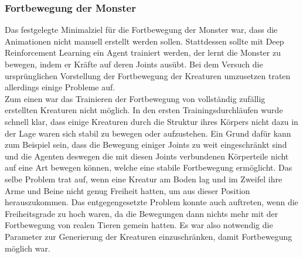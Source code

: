 \subsubsection{Fortbewegung der Monster}

Das festgelegte Minimalziel für die Fortbewegung der Monster war, dass die Animationen nicht manuell erstellt werden sollen. 
Stattdessen sollte mit Deep Reinforcement Learning ein Agent trainiert werden, der lernt die Monster zu bewegen, indem er Kräfte auf deren Joints ausübt.
Bei dem Versuch die ursprünglichen Vorstellung der Fortbewegung der Kreaturen umzusetzen traten allerdings einige Probleme auf.\\

Zum einen war das Trainieren der Fortbewegung von vollständig zufällig erstellten Kreaturen nicht möglich. 
In den ersten Trainingsdurchläufen wurde schnell klar, dass einige Kreaturen durch die Struktur ihres Körpers nicht dazu in der Lage waren sich stabil zu bewegen oder aufzustehen.
Ein Grund dafür kann zum Beispiel sein, dass die Bewegung einiger Joints zu weit eingeschränkt sind und die Agenten deswegen die mit diesen Joints verbundenen Körperteile nicht auf eine Art bewegen können, welche eine stabile Fortbewegung ermöglicht. Das selbe Problem trat auf, wenn eine Kreatur am Boden lag und im Zweifel ihre Arme und Beine nicht genug Freiheit hatten, um aus dieser Position herauszukommen.
Das entgegengesetzte Problem konnte auch auftreten, wenn die Freiheitsgrade zu hoch waren, da die Bewegungen dann nichts mehr mit der Fortbewegung von realen Tieren gemein hatten. Es war also notwendig die Parameter zur Generierung der Kreaturen einzuschränken, damit Fortbewegung möglich war.\\

